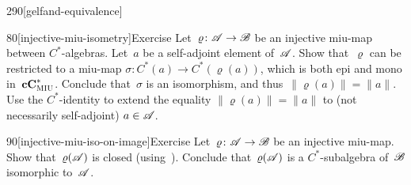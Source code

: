 \begin{parsec}{290}[gelfand-equivalence]
\begin{point}{80}[injective-miu-isometry]{Exercise}
Let~$\varrho\colon \mathscr{A}\to\mathscr{B}$
be an injective miu-map between $C^*$-algebras.
Let~$a$ be a self-adjoint element of~$\mathscr{A}$.
Show that~$\varrho$ can be restricted
to a miu-map $\sigma\colon C^*(a)\to C^*(\varrho(a))$,
which is both epi and mono in~$\mathbf{cC}^*_{\text{\textsc{MIU}}}$.
Conclude that~$\sigma$ is an isomorphism,
and thus~$\|\varrho(a)\|=\|a\|$.
Use the $C^*$-identity
to extend the equality $\|\varrho(a)\|=\|a\|$ 
to (not necessarily self-adjoint) $a\in \mathscr{A}$.
\end{point}
\begin{point}{90}[injective-miu-iso-on-image]{Exercise}%
Let~$\varrho\colon \mathscr{A}\to\mathscr{B}$ 
be an injective miu-map.
Show that~$\varrho(\mathscr{A})$
is closed (using~).
Conclude that~$\varrho(\mathscr{A})$
is a
 $C^*$-subalgebra of~$\mathscr{B}$
isomorphic to~$\mathscr{A}$.
\end{point}
\end{parsec}

